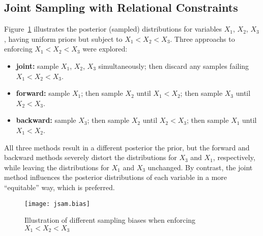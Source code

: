 \subsection{Joint Sampling with Relational Constraints}\label{app.math.distr.jsam}
Figure~\ref{fig:jsam.bias} illustrates the posterior (sampled) distributions
for variables $X_1$, $X_2$, $X_3$, having uniform priors but subject to $X_1 < X_2 < X_3$.
Three approachs to enforcing $X_1 < X_2 < X_3$ were explored:
\begin{itemize}
  \item \textbf{joint:}
    sample $X_1$, $X_2$, $X_3$ simultaneously;
    then discard any samples failing $X_1 < X_2 < X_3$.
  \item \textbf{forward:}
    sample $X_1$;
    then sample $X_2$ until $X_1 < X_2$;
    then sample $X_3$ until $X_2 < X_3$.
  \item \textbf{backward:}
    sample $X_3$;
    then sample $X_2$ until $X_2 < X_3$;
    then sample $X_1$ until $X_1 < X_2$.
\end{itemize}
All three methods result in a different posterior \vs the prior,
but the forward and backward methods
severely distort the distributions for $X_3$ and $X_1$, respectively,
while leaving the distributions for $X_1$ and $X_3$ unchanged.
By contrast, the joint method influences the posterior distributions of each variable
in a more ``equitable'' way, which is preferred.
\begin{figure}[h]
  \centering
  \texttt{[image: jsam.bias]}
  \caption{Illustration of different sampling biases when enforcing $X_1 < X_2 < X_3$}
  \label{fig:jsam.bias}
\end{figure}